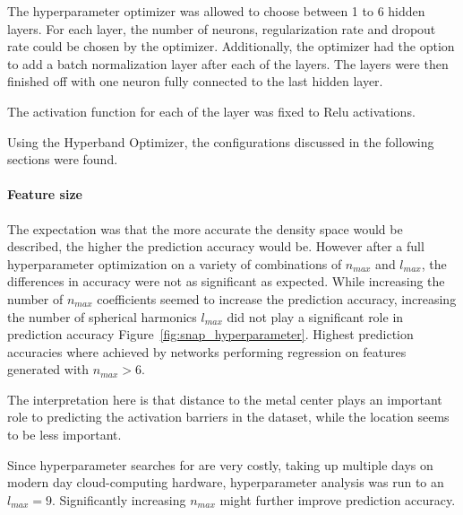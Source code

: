 The hyperparameter optimizer was allowed to choose between 1 to 6 hidden layers.
For each layer, the number of neurons, regularization rate and dropout rate could be chosen by the optimizer.
Additionally, the optimizer had the option to add a batch normalization layer after each of the layers.
The layers were then finished off with one neuron fully connected to the last hidden layer.

The activation function for each of the layer was fixed to Relu activations.

Using the Hyperband Optimizer, the configurations discussed in the following sections were found.

\paragraph{Feature size}
The expectation was that the more accurate the density space would be described, the higher the prediction accuracy would be.
However after a full hyperparameter optimization on a variety of combinations of $n_{max}$ and $l_{max}$,
the differences in accuracy were not as significant as expected.
While increasing the number of $n_{max}$ coefficients seemed to increase the prediction accuracy,
increasing the number of spherical harmonics $l_{max}$ did not play a significant role in prediction accuracy Figure~\ref{fig:snap_hyperparameter}.
Highest prediction accuracies where achieved by networks performing regression on features generated with $n_{max} > 6$.

The interpretation here is that distance to the metal center plays an important role to predicting the activation
barriers in the dataset, while the location seems to be less important.

Since hyperparameter searches for are very costly, taking up multiple days on modern day cloud-computing hardware,
hyperparameter analysis was run to an $l_{max} = 9$.
Significantly increasing $n_{max}$ might further improve prediction accuracy.

